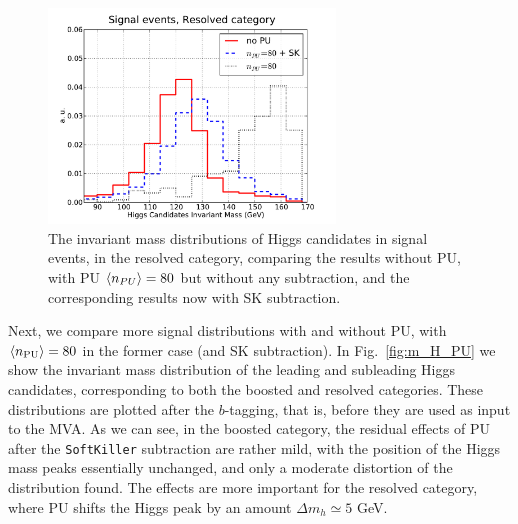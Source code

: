 \begin{figure}[t]
  \begin{center}
  \includegraphics[width=0.68\textwidth]{plots/m_htot_res_signal_PUnoSK.pdf}
    \caption{\small
    The invariant mass distributions of Higgs candidates in signal
events, in the resolved category, comparing the results without PU,
with PU $\left\langle n_{PU}\right\rangle=80$ but without any subtraction, and the
corresponding results now with SK subtraction.
}
\label{fig:PUvalidation}
\end{center}
\end{figure}

Next, we compare more
 signal distributions with
and without PU, with $\left\langle n_{\rm PU}\right\rangle=80$ in the
former
case (and SK subtraction).
%
In Fig.~\ref{fig:m_H_PU} we show the invariant mass distribution
of the leading and subleading Higgs candidates, corresponding to both
the boosted
and resolved categories.
%
These distributions are plotted after the $b$-tagging, that is,
before they are used as input to the MVA.
%
As we can see, in the boosted category, the residual effects of PU
after the {\tt SoftKiller} subtraction are rather mild,
with the position of the Higgs mass peaks essentially
unchanged, and only a moderate distortion of the
distribution found.
%
The effects are more important for the resolved category, where PU
shifts the Higgs peak by an amount $\Delta m_h \simeq 5$ GeV.

